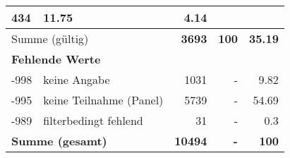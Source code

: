 \begin{longtable}{lXrrr}
       \num{434} &
       \num[round-mode=places,round-precision=2]{11,75} &
         \num[round-mode=places,round-precision=2]{4,14} \\
     \midrule
     \multicolumn{2}{l}{Summe (gültig)} &
       \textbf{\num{3693}} &
     \textbf{100} &
       \textbf{\num[round-mode=places,round-precision=2]{35,19}} \\
     \multicolumn{5}{l}{\textbf{Fehlende Werte}}\\
       -998 &
       keine Angabe &
         \num{1031} &
        - &
         \num[round-mode=places,round-precision=2]{9,82} \\
       -995 &
       keine Teilnahme (Panel) &
         \num{5739} &
        - &
         \num[round-mode=places,round-precision=2]{54,69} \\
       -989 &
       filterbedingt fehlend &
         \num{31} &
        - &
         \num[round-mode=places,round-precision=2]{0,3} \\
     \midrule
     \multicolumn{2}{l}{\textbf{Summe (gesamt)}} &
          \textbf{\num{10494}} &
        \textbf{-} &
        \textbf{100} \\
     \bottomrule
     \end{longtable}
     
